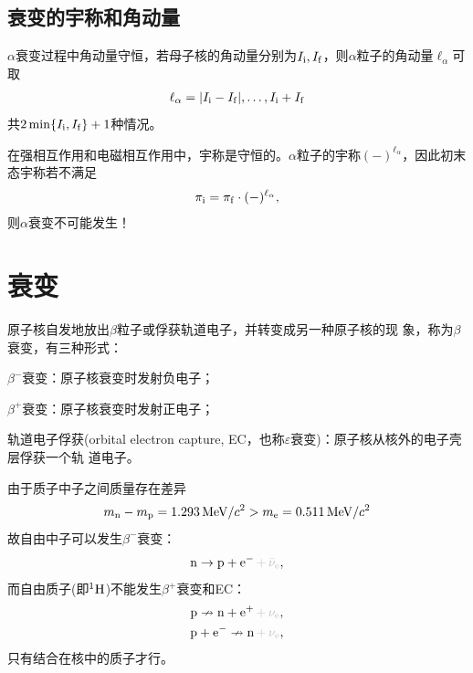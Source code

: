 \subsection{\textalpha 衰变的宇称和角动量}

$\alpha$衰变过程中角动量守恒，若母子核的角动量分别为$I_{\mathrm{i}},I_{\mathrm{f}}$，则$\alpha$粒子的角动量$\ell_\alpha$可取
\begin{align}
	\ell_\alpha=|I_{\mathrm{i}}-I_{\mathrm{f}}|,\ldots,I_{\mathrm{i}}+I_{\mathrm{f}}
\end{align}
共$2\min\{I_{\mathrm{i}},I_{\mathrm{f}}\}+1$种情况。

在强相互作用和电磁相互作用中，宇称是守恒的。$\alpha$粒子的宇称$(-)^{\ell_\alpha}$，因此初末态宇称若不满足
\begin{align}
	\pi_{\mathrm{i}}=\pi_{\mathrm{f}}\cdot(-)^{\ell_\alpha},
\end{align}
则$\alpha$衰变不可能发生！

\section{\textbeta 衰变}

原子核自发地放出$\beta$粒子或俘获轨道电子，并转变成另一种原子核的现
象，称为$\beta$衰变，有三种形式：
\begin{compactenum}
	\item $\beta^-$衰变：原子核衰变时发射负电子；
	\item $\beta^+$衰变：原子核衰变时发射正电子；
	\item 轨道电子俘获(orbital electron capture, EC，也称$\varepsilon$衰变)：原子核从核外的电子壳层俘获一个轨
	道电子。
\end{compactenum}

由于质子中子之间质量存在差异
\[
	m_\nton - m_\pton = \SI{1.293}{\MeV}/c^2 > m_\elc = \SI{0.511}{MeV}/c^2
\]
故自由中子可以发生$\beta^-$衰变：
\[
	\nton\to\pton+\elc^-\textcolor{lightgray}{\,+\,\bar\nu_\elc},
\]
而自由质子(即${^{1}\mathrm{H}}$)不能发生$\beta^+$衰变和EC：
\begin{gather*}
	\pton\nrightarrow \nton+\elc^+\textcolor{lightgray}{\,+\,\nu_\elc},\\
	\pton+\elc^-\nrightarrow \nton\textcolor{lightgray}{\,+\,\nu_\elc},
\end{gather*}
只有结合在核中的质子才行。

